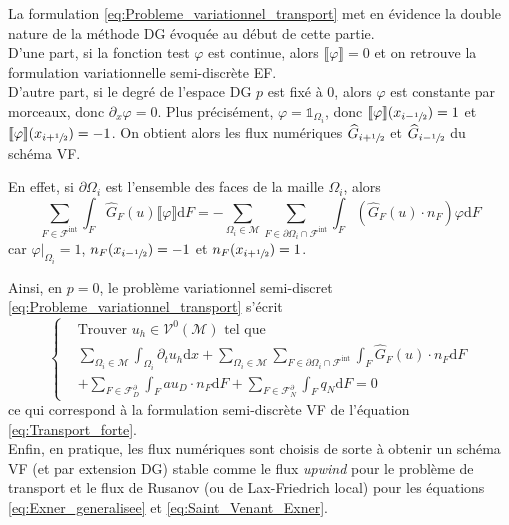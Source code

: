 \documentclass[11pt, a4paper, oneside]{report}
\newcommand{\restricdynamic}[2]{\left.#1\right\vert_{#2}}
\begin{document}
La formulation \eqref{eq:Probleme_variationnel_transport} met en évidence la double nature de la méthode DG évoquée au début de cette partie. \\
D'une part, si la fonction test $\varphi$ est continue, alors $\llbracket \varphi \rrbracket = 0$ et on retrouve la formulation variationnelle semi-discrète EF. \\
D'autre part, si le degré de l'espace DG $p$ est fixé à 0, alors $\varphi$ est constante par morceaux, donc $\partial_x \varphi = 0$. Plus précisément, $\varphi = \mathds{1}_{\Omega_i}$, donc $\llbracket \varphi \rrbracket(x_{i - \sfrac{1}{2}}) = 1$ et $\llbracket \varphi \rrbracket(x_{i + \sfrac{1}{2}}) = -1$. On obtient alors les flux numériques $\widehat{G}_{i + \sfrac{1}{2}}$ et $\widehat{G}_{i - \sfrac{1}{2}}$ du schéma VF. \\
\begin{samepage}
    En effet, si $\partial \Omega_i$ est l'ensemble des faces de la maille $\Omega_i$, alors
    \begin{equation}
        \sum_{F \in \mathcal{F}^\text{int}} \int_F \widehat{G}_F(u) \llbracket \varphi \rrbracket \text{d}F = - \sum_{\Omega_i \in \mathcal{M}} \sum_{F \in \partial \Omega_i \cap \mathcal{F}^\text{int}} \int_F (\widehat{G}_F(u) \cdot n_F) \varphi \text{d}F
    \end{equation}
    car $\restricdynamic{\varphi}{\Omega_i} = 1$, $n_F(x_{i-\sfrac{1}{2}}) = -1$ et $n_F(x_{i+\sfrac{1}{2}}) = 1$.
\end{samepage}

Ainsi, en $p = 0$, le problème variationnel semi-discret \eqref{eq:Probleme_variationnel_transport} s'écrit
\begin{equation}
    \left \{
    \begin{aligned}
        &\text{Trouver } u_h \in \mathcal{V}^0(\mathcal{M}) \text{ tel que} \\
        &\sum_{\Omega_i \in \mathcal{M}} \int_{\Omega_i} \partial_t u_h \text{d}x + \sum_{\Omega_i \in \mathcal{M}} \sum_{F \in \partial \Omega_i \cap \mathcal{F}^\text{int}} \int_F \widehat{G}_F(u) \cdot n_F \text{d}F \\
        &+ \sum_{F \in \mathcal{F}_D^\partial} \int_F a u_D \cdot n_F \text{d}F + \sum_{F \in \mathcal{F}_N^\partial} \int_F q_N \text{d}F = 0
    \end{aligned}
    \right .
\end{equation}
ce qui correspond à la formulation semi-discrète VF de l'équation \eqref{eq:Transport_forte}. \\
Enfin, en pratique, les flux numériques sont choisis de sorte à obtenir un schéma VF (et par extension DG) stable comme le flux \textit{upwind} pour le problème de transport et le flux de Rusanov (ou de Lax-Friedrich local) pour les équations \eqref{eq:Exner_generalisee} et \eqref{eq:Saint_Venant_Exner}. \\
\end{document}

